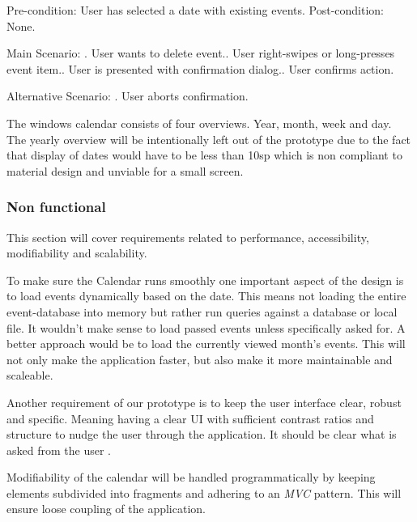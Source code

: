 \documentclass[]{article}
\begin{document}
\begin{flushleft}
\begin{center}
{{		Pre-condition: User has selected a date with existing events.\newline
		Post-condition: None.\newline
		
		Main Scenario: . User wants to delete event.. User right-swipes or long-presses event item.. User is presented with confirmation dialog.. User confirms action.\newline
		
		Alternative Scenario: . User aborts confirmation.\newline
	}
}\medskip
\end{center}


The windows calendar consists of four overviews. Year, month, week and day. The yearly overview will be intentionally left out of the prototype due to the fact that display of dates would have to be less than 10sp which is non compliant to material design and unviable for a small screen\parencite{typog}.\medskip

\subsubsection{Non functional}
This section will cover requirements related to performance, accessibility, modifiability and scalability.\medskip

To make sure the Calendar runs smoothly one important aspect of the design is to load events dynamically based on the date. This means not loading the entire event-database into memory but rather run queries against a database or local file. It wouldn't make sense to load passed events unless specifically asked for. A better approach would be to load the currently viewed month's events. This will not only make the application faster, but also make it more maintainable and scaleable.\medskip

Another requirement of our prototype is to keep the user interface clear, robust and specific.
Meaning having a clear UI with sufficient contrast ratios and structure to nudge the user through the application. It should be clear what is asked from the user \parencite{acc}.
\medskip

Modifiability of the calendar will be handled programmatically by keeping elements subdivided into fragments and adhering to an \textit{MVC} pattern. This will ensure loose coupling of the application.


\end{flushleft}
\end{document}
